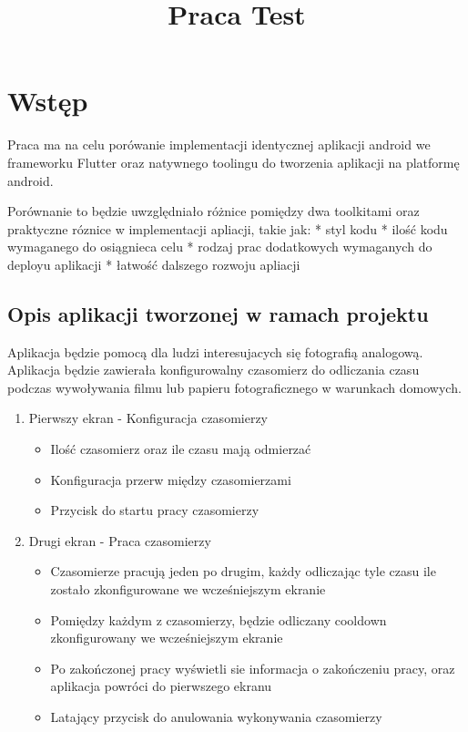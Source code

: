\documentclass[12pt,a4paper]{article}
\title{Praca Test}
\begin{document}
\section{Wstęp}

Praca ma na celu porówanie implementacji identycznej aplikacji android we frameworku Flutter 
oraz natywnego toolingu do tworzenia aplikacji na platformę android. 

Porównanie to będzie uwzględniało różnice pomiędzy dwa toolkitami oraz praktyczne róznice w implementacji apliacji, takie jak: 
 * styl kodu
 * ilość kodu wymaganego do osiągnieca celu
 * rodzaj prac dodatkowych wymaganych do deployu aplikacji
 * łatwość dalszego rozwoju apliacji

\subsection{Opis aplikacji tworzonej w ramach projektu}

Aplikacja będzie pomocą dla ludzi interesujacych się fotografią analogową. Aplikacja będzie zawierała konfigurowalny czasomierz do odliczania czasu
podczas wywoływania filmu lub papieru fotograficznego w warunkach domowych.

\begin{enumerate}
    \item Pierwszy ekran - Konfiguracja czasomierzy
    \begin{itemize}
        \item Ilość czasomierz oraz ile czasu mają odmierzać
        \item Konfiguracja przerw między czasomierzami
        \item Przycisk do startu pracy czasomierzy
    \end{itemize}
    \item Drugi ekran - Praca czasomierzy
    \begin{itemize}
        \item Czasomierze pracują jeden po drugim, każdy odliczając tyle czasu ile zostało zkonfigurowane we wcześniejszym ekranie
        \item Pomiędzy każdym z czasomierzy, będzie odliczany cooldown zkonfigurowany we wcześniejszym ekranie
        \item Po zakończonej pracy wyświetli sie informacja o zakończeniu pracy, oraz aplikacja powróci do pierwszego ekranu
        \item Latający przycisk do anulowania wykonywania czasomierzy
    \end{itemize}
\end{enumerate}
\end{document}
